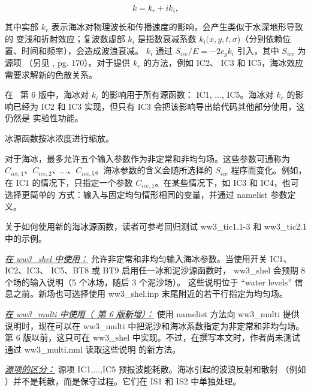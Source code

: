 \begin{equation}\label{eq:waveno}
     {k} = {k_r} + i{k_i},
\end{equation}

\noindent
其中实部 ${k_r}$ 表示海冰对物理波长和传播速度的影响，会产生类似于水深地形导致的
变浅和折射效应；复波数虚部 ${k_i}$ 是指数衰减系数
${k_i}({x},{y},{t},\sigma $)（分别依赖位置、时间和频率），会造成波浪衰减。
${k_i}$ 通过 ${S_{ice}}/{E}=-2{c_g}{k_i}$ 引入，其中 ${S_{ice}}$ 为源项
（另见 \cite{bk:WAM94}, pg. 170）。对于提供 ${k_r}$ 的方法，例如 {\code IC2}、
{\code IC3} 和 {\code IC5}，海冰效应需要求解新的色散关系。

在 \ws\ 第 6 版中，海冰对 ${k_i}$ 的影响用于所有源函数：
{\code IC1}, ..., {\code IC5}。海冰对 ${k_r}$ 的影响已经为 {\code IC2} 和
{\code IC3} 实现，但只有 {\code IC3} 会把该影响导出给代码其他部分使用，这仍然是
实验性功能。


冰源函数按冰浓度进行缩放。

对于海冰，最多允许五个输入参数作为非定常和非均匀场。这些参数可通称为
${C_{ice,1}}$、${C_{ice,2}}$、...、${C_{ice,5}}$。海冰参数的含义会随所选择的
${S_{ice}}$ 程序而变化。例如，在 {\code IC1} 的情况下，只指定一个参数
${C_{ice,1}}$。在某些情况下，如 {\code IC3} 和 {\code IC4}，也可选择更简单的
方式：输入与固定均匀情形相同的变量，并通过 namelist 参数定义。

关于如何使用新的海冰源函数，读者可参考回归测试 {\file ww3\_tic1.1-3} 和
{\file ww3\_tic2.1} 中的示例。

\textrm{\textit{\underline{在 {\file ww3\_shel} 中使用：}}}
允许非定常和非均匀输入海冰参数。当使用开关 {\code IC1}、{\code IC2}、{\code IC3}、
{\code IC5}、{\code BT8} 或 {\code BT9} 启用任一冰和泥沙源函数时，
{\file ww3\_shel} 会预期 8 个场的输入说明（5 个冰场，随后 3 个泥沙场）。
这些说明位于 ``water levels'' 信息之前。新场也可选择使用 {\file ww3\_shel.inp}
末尾附近的若干行指定为均匀场。

\textrm{\textit{\underline{在 {\file ww3\_multi} 中使用（\ws\ 第 6 版新增）：}}}
使用 namelist 方法向 {\file ww3\_multi} 提供说明时，现在可以在 {\file ww3\_multi}
中把泥沙和海冰系数指定为非定常和非均匀场。第 6 版以前，这只可在 {\file ww3\_shel}
中实现。不过，在撰写本文时，作者尚未测试通过 {\file ww3\_multi.nml} 读取这些说明
的新方法。

\textrm{\textit{\underline{源项的区分：}}}
源项 {\code IC1},...,{\code IC5} 预报波能耗散。海冰引起的波浪反射和散射
（例如 \cite{art:Wad75}）并不是耗散，而是保守过程。它们在 {\code IS1} 和
{\code IS2} 中单独处理。
